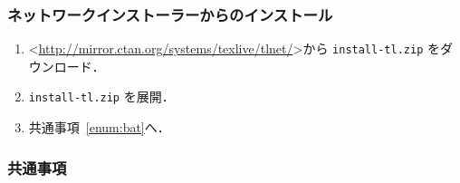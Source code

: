 \subsubsection*{ネットワークインストーラーからのインストール}

\begin{enumerate}
    \item \textless\url{http://mirror.ctan.org/systems/texlive/tlnet/}\textgreater から \verb|install-tl.zip| をダウンロード．
    \item \verb|install-tl.zip| を展開．
    \item 共通事項~\ref{enum:bat}へ．
\end{enumerate}

\subsubsection*{共通事項}

